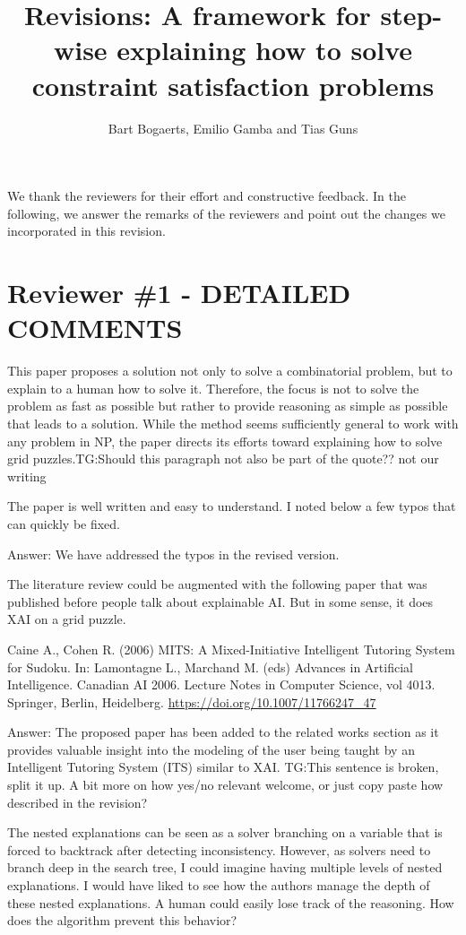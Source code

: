 \documentclass{article}
\title{Revisions: A framework for step-wise explaining how to solve constraint satisfaction problems}
\author{Bart Bogaerts, Emilio Gamba and Tias Guns}
\date{}
\newcommand\comment[1]{\marginpar{\tiny #1}}
\renewcommand\comment[1]{#1}
\newcommand{\tias}[1]{{\comment{\color{blue}\textsc{TG:}#1}}}
\newcommand{\emilio}[1]{{\comment{Answer: \color{red}#1}}}
\begin{document}
	\maketitle
We thank the reviewers for their effort and constructive feedback. In the following, we answer the remarks of the reviewers and point out the changes we incorporated in this revision.

\section*{Reviewer \#1 - DETAILED COMMENTS}

This paper proposes a solution not only to solve a combinatorial
problem, but to explain to a human how to solve it. Therefore, the
focus is not to solve the problem as fast as possible but rather to
provide reasoning as simple as possible that leads to a solution. While
the method seems sufficiently general to work with any problem in NP,
the paper directs its efforts toward explaining how to solve grid
puzzles.\tias{Should this paragraph not also be part of the quote?? not our writing}

\begin{quoteit}
The paper is well written and easy to understand. I noted below a few typos that can quickly be fixed.
\end{quoteit}

\emilio{We have addressed the typos in the revised version.}

\begin{quoteit}
The literature review could be augmented with the following paper that was published before people talk about explainable AI. But in some sense, it does XAI on a grid puzzle.

Caine A., Cohen R. (2006) MITS: A Mixed-Initiative Intelligent Tutoring System for Sudoku. In: Lamontagne L., Marchand M. (eds) Advances in Artificial Intelligence. Canadian AI 2006. Lecture Notes in Computer Science, vol 4013. Springer, Berlin, Heidelberg. \url{https://doi.org/10.1007/11766247_47}
\end{quoteit}

\emilio{The proposed paper has been added to the related works section as it provides valuable insight into the modeling of the user being taught by an Intelligent Tutoring System (ITS) similar to XAI.} \tias{This sentence is broken, split it up. A bit more on how yes/no relevant welcome, or just copy paste how described in the revision?}

\begin{quoteit}
The nested explanations can be seen as a solver branching on a variable that is forced to backtrack after detecting inconsistency. However, as solvers need to branch deep in the search tree, I could imagine having multiple levels of nested explanations. I would have liked to see how the authors manage the depth of these nested explanations. A human could easily lose track of the reasoning. How does the algorithm prevent this behavior?
\end{quoteit}
\end{document}

